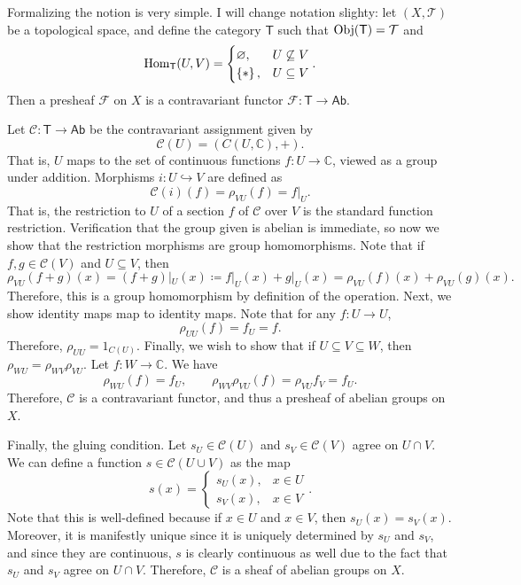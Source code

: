 \documentclass[11pt]{report}
\begin{document}
\begin{solution}
	Formalizing the notion is very simple. I will change notation slighty: let $(X,\mathcal{T} )$ be a topological space, and define the category $\mathsf{T} $ such that $\operatorname{Obj}(\mathsf{T} ) =\mathcal{T} $ and
	\[
		\operatorname{Hom}_{\mathsf{T} }(U, V) =
		\begin{cases}
			\varnothing ,&U\not\subseteq V\\
			\left\{ * \right\} ,&U\subseteq V
		\end{cases}
	.\]
	Then a presheaf $\mathscr{F} $ on $X$ is a contravariant functor $\mathscr{F} : \mathsf{T}  \to \mathsf{Ab} $.

	Let $\mathscr{C} : \mathsf{T}  \to \mathsf{Ab} $ be the contravariant assignment given by
	\[
		\mathscr{C} (U)=(C(U,\mathbb{C} ),+)
	.\]
	That is, $U$ maps to the set of continuous functions $f : U \to \mathbb{C} $, viewed as a group under addition. Morphisms $i : U \hookrightarrow V$ are defined as
	\[
		\mathscr{C} (i)(f)=\rho_{VU} (f)=f|_{U}
	.\]
	That is, the restriction to $U$ of a section $f$ of $\mathscr{C} $ over $V$ is the standard function restriction. Verification that the group given is abelian is immediate, so now we show that the restriction morphisms are group homomorphisms. Note that if $f,g\in \mathscr{C} (V)$ and $U\subseteq V$, then
	\[
		\rho_{VU} (f+g)(x)=(f+g)|_{U}(x)\coloneqq f|_U(x)+g|_U(x)=\rho_{VU} (f)(x)+\rho_{VU} (g)(x)
	.\]
	Therefore, this is a group homomorphism by definition of the operation. Next, we show identity maps map to identity maps. Note that for any $f : U \to U$,
	\[
		\rho_{UU} (f)=f_U=f	
	.\]
	Therefore, $\rho_{UU} =1_{C(U)} $. Finally, we wish to show that if $U\subseteq V\subseteq W$, then $\rho_{WU} =\rho_{WV} \rho_{VU} $. Let $f : W \to \mathbb{C} $. We have
	\[
		\rho_{WU} (f)=f_{U} ,\qquad \rho_{WV}\rho_{VU} (f)=\rho_{VU}f_V=f_U
	.\]
	Therefore, $\mathscr{C} $ is a contravariant functor, and thus a presheaf of abelian groups on $X$.

	Finally, the gluing condition. Let $s_U\in \mathscr{C} (U)$ and $s_V\in \mathscr{C} (V)$ agree on $U \cap V$. We can define a function $s\in \mathscr{C} (U \cup V)$ as the map
	\[
		s(x)=
		\begin{cases}
			s_U(x),&x\in U\\
			s_V(x),&x\in V
		\end{cases}	
	.\]
	Note that this is well-defined because if $x\in U$ and $x\in V$, then $s_U(x)=s_V(x)$. Moreover, it is manifestly unique since it is uniquely determined by $s_U$ and $s_V$, and since they are continuous, $s$ is clearly continuous as well due to the fact that $s_U$ and $s_V$ agree on $U \cap V$. Therefore, $\mathscr{C} $ is a sheaf of abelian groups on $X$.
\end{solution}
\end{document}

